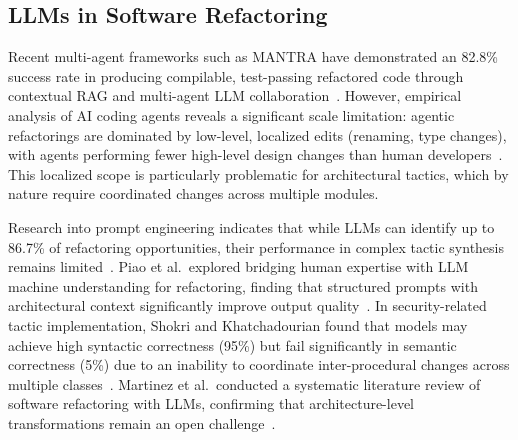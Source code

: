 \documentclass[sigconf,review,anonymous]{acmart}
\begin{document}
\subsection{LLMs in Software Refactoring}
Recent multi-agent frameworks such as MANTRA have demonstrated an 82.8\% success rate in producing compilable, test-passing refactored code through contextual RAG and multi-agent LLM collaboration~\cite{xu2025mantra}. However, empirical analysis of AI coding agents reveals a significant scale limitation: agentic refactorings are dominated by low-level, localized edits (renaming, type changes), with agents performing fewer high-level design changes than human developers~\cite{horikawa2025agentic}. This localized scope is particularly problematic for architectural tactics, which by nature require coordinated changes across multiple modules.

Research into prompt engineering indicates that while LLMs can identify up to 86.7\% of refactoring opportunities, their performance in complex tactic synthesis remains limited~\cite{liu2025exploring}. Piao et al.\ explored bridging human expertise with LLM machine understanding for refactoring, finding that structured prompts with architectural context significantly improve output quality~\cite{piao2025refactoring}. In security-related tactic implementation, Shokri and Khatchadourian found that models may achieve high syntactic correctness (95\%) but fail significantly in semantic correctness (5\%) due to an inability to coordinate inter-procedural changes across multiple classes~\cite{shokri2024ipsynth}. Martinez et al.\ conducted a systematic literature review of software refactoring with LLMs, confirming that architecture-level transformations remain an open challenge~\cite{martinez2025refactoring}.
\end{document}
